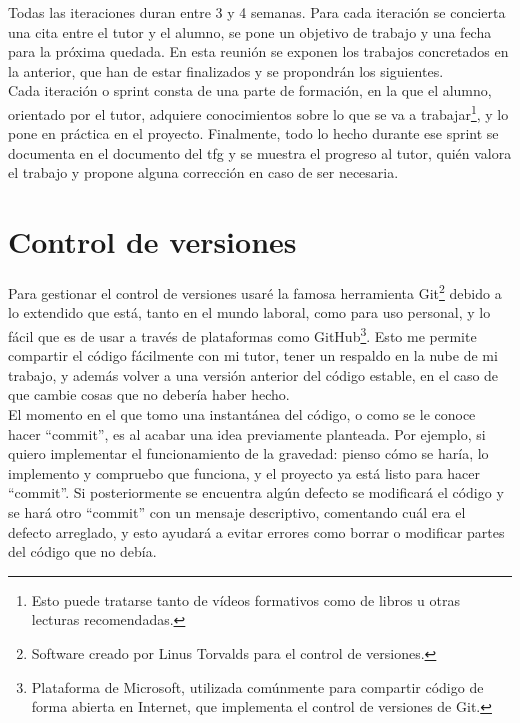 Todas las iteraciones duran entre 3 y 4 semanas. Para cada iteración se concierta una cita entre el tutor y el alumno, se pone un objetivo de trabajo y una fecha para la próxima quedada. En esta reunión se exponen los trabajos concretados en la anterior, que han de estar finalizados y se propondrán los siguientes.
\\
Cada iteración o sprint consta de una parte de formación, en la que el alumno, orientado por el tutor, adquiere conocimientos sobre lo que se va a trabajar\footnote{Esto puede tratarse tanto de vídeos formativos como de libros u otras lecturas recomendadas.}, y lo pone en práctica en el proyecto. Finalmente, todo lo hecho durante ese sprint se documenta en el documento del \gls{tfg} y se muestra el progreso al tutor, quién valora el trabajo y propone alguna corrección en caso de ser necesaria.

\section{Control de versiones}
Para gestionar el control de versiones usaré la famosa herramienta Git\footnote{Software creado por Linus Torvalds para el control de versiones.} debido a lo extendido que está, tanto en el mundo laboral, como para uso personal, y lo fácil que es de usar a través de plataformas como GitHub\footnote{Plataforma de Microsoft, utilizada comúnmente para compartir código de forma abierta en Internet, que implementa el control de versiones de Git.}. Esto me permite compartir el código fácilmente con mi tutor, tener un respaldo en la nube de mi trabajo, y además volver a una versión anterior del código estable, en el caso de que cambie cosas que no debería haber hecho.
\\
El momento en el que tomo una instantánea del código, o como se le conoce hacer ``commit'', es al acabar una idea previamente planteada. Por ejemplo, si quiero implementar el funcionamiento de la gravedad: pienso cómo se haría, lo implemento y compruebo que funciona, y el proyecto ya está listo para hacer ``commit''. Si posteriormente se encuentra algún defecto se modificará el código y se hará otro ``commit'' con un mensaje descriptivo, comentando cuál era el defecto arreglado, y esto ayudará a evitar errores como borrar o modificar partes del código que no debía. 

